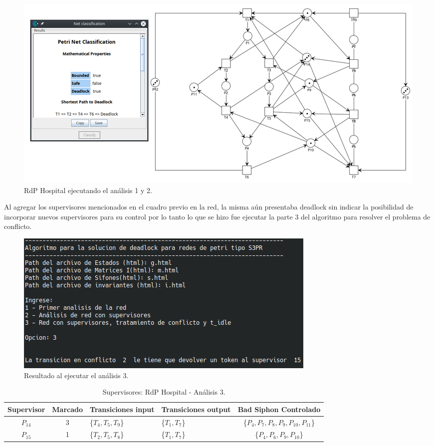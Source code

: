 \begin{figure}[H]
	\centering
	\includegraphics[width=\textwidth]{Figures/algoritmo4/hospital_imag2.png}
	\caption{RdP Hospital ejecutando el análisis 1 y 2.}
	\label{fig:Rdp-Hospital1y2v4}
\end{figure}

Al agregar los supervisores mencionados en el cuadro previo en la red, la misma aún presentaba deadlock sin indicar la posibilidad de incorporar nuevos supervisores para su control por lo tanto lo que se hizo fue ejecutar la parte 3 del algoritmo para resolver el problema de conflicto.
\bigskip

\begin{figure}[H]
	\centering
	\includegraphics[width=\textwidth]{Figures/algoritmo4/terminal-Hospital-Ejec3.png}
	\caption{Resultado al ejecutar el análisis 3.}
	\label{fig:Rdp-Hospital3v4}
\end{figure}
\bigskip

\begin{table}[H]
    \small
    \centering
    \begin{tabular}{|c|c|P{2.2cm}|P{2.2cm}|c|}
    \hline
    \textbf{Supervisor} & \textbf{Marcado} & \textbf{Transiciones input} & \textbf{Transiciones output} & \textbf{Bad Siphon Controlado}  \\  \hline
    $P_{14}$ & 3 & \{$T_{4}, T_{5}, T_{9}$\} & \{$T_{1}, T_{7}$\} & \{$P_4, P_{7}, P_{8}, P_{9}, P_{10}, P_{11}$\} \\ 
    \hline
    $P_{15}$ & 1 & \{$T_{2}, T_{5}, T_{8}$\} & \{$T_{1}, T_{7}$\} & \{$P_{4},P_{6},P_{9},P_{10}$\} \\ 
    \hline
    \end{tabular}
    \caption{Supervisores: RdP Hospital - Análisis 3.}
    \label{tab:Hospital3-v4}
\end{table}
\bigskip

